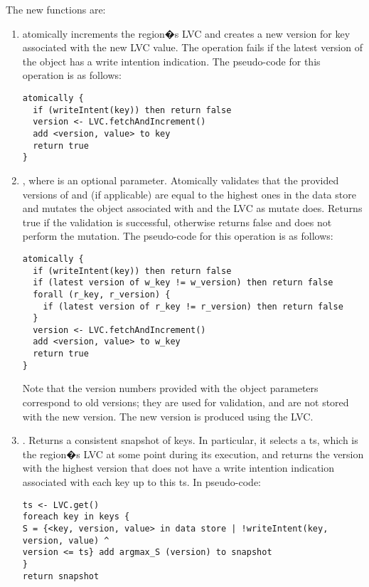 The new functions are:
\begin{enumerate}
  \item {} atomically increments the region�s LVC
  and creates a new version for key associated with the new LVC value. The
  operation fails if the latest version of the object has a write intention
  indication. The pseudo-code for this operation is as follows:
\begin{verbatim}
atomically {
  if (writeIntent(key)) then return false
  version <- LVC.fetchAndIncrement()
  add <version, value> to key
  return true
}
\end{verbatim}
  \item {}, where \robjs is an optional parameter.
Atomically validates that the provided versions of \wkey and \rkeys (if
applicable)  are equal to the highest ones in the data store and mutates the
object associated with \wkey and the LVC as mutate does. Returns true if the
validation is successful, otherwise returns false and does not perform the
mutation. The pseudo-code for this operation is as follows:
{\tiny
\begin{verbatim}
atomically {
  if (writeIntent(key)) then return false
  if (latest version of w_key != w_version) then return false
  forall (r_key, r_version) {
    if (latest version of r_key != r_version) then return false
  }
  version <- LVC.fetchAndIncrement()
  add <version, value> to w_key
  return true
}
\end{verbatim}} 
Note that the version numbers provided with the object parameters correspond to
old versions; they are used for validation, and are not stored with the new
version. The new version is produced using the LVC.
\item {}.   
Returns a consistent snapshot of keys. In particular, it selects a ts, which is the region�s LVC at some point during its execution, and returns the version with the highest version that does not have a write intention indication associated with each key up to this ts. In pseudo-code:
{\tiny
\begin{verbatim}
ts <- LVC.get()
foreach key in keys {
S = {<key, version, value> in data store | !writeIntent(key, version, value) ^
version <= ts} add argmax_S (version) to snapshot
}
return snapshot
\end{verbatim}}
\end{enumerate}


